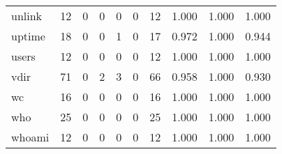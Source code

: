 \begin{longtable}{lp{2.0cm}p{2.0cm}p{2.0cm}p{2.0cm}p{2.0cm}p{2.0cm}p{2.0cm}p{2.0cm}p{2.0cm}}
unlink    &                     12 &                                             0 &                                            0 &                                           0 &                                            0 &                                         12 &                                1.000 &                                  1.000 &                                1.000 \\
uptime    &                     18 &                                             0 &                                            0 &                                           1 &                                            0 &                                         17 &                                0.972 &                                  1.000 &                                0.944 \\
users     &                     12 &                                             0 &                                            0 &                                           0 &                                            0 &                                         12 &                                1.000 &                                  1.000 &                                1.000 \\
vdir      &                     71 &                                             0 &                                            2 &                                           3 &                                            0 &                                         66 &                                0.958 &                                  1.000 &                                0.930 \\
wc        &                     16 &                                             0 &                                            0 &                                           0 &                                            0 &                                         16 &                                1.000 &                                  1.000 &                                1.000 \\
who       &                     25 &                                             0 &                                            0 &                                           0 &                                            0 &                                         25 &                                1.000 &                                  1.000 &                                1.000 \\
whoami    &                     12 &                                             0 &                                            0 &                                           0 &                                            0 &                                         12 &                                1.000 &                                  1.000 &                                1.000 \\

\end{longtable}
